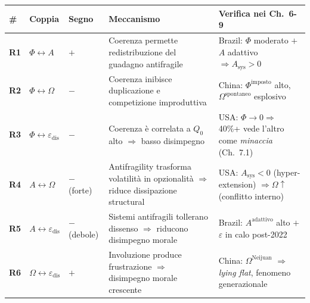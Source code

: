 {\def\LTcaptype{none} %
{\small\begin{longtable}[]{@{}
  >{\raggedright\arraybackslash}p{}
  >{\raggedright\arraybackslash}p{}
  >{\raggedright\arraybackslash}p{}
  >{\raggedright\arraybackslash}p{}
  >{\raggedright\arraybackslash}p{}@{}}
\toprule\noalign{}
\begin{minipage}[b]{\linewidth}\raggedright
\#
\end{minipage} & \begin{minipage}[b]{\linewidth}\raggedright
Coppia
\end{minipage} & \begin{minipage}[b]{\linewidth}\raggedright
Segno
\end{minipage} & \begin{minipage}[b]{\linewidth}\raggedright
Meccanismo
\end{minipage} & \begin{minipage}[b]{\linewidth}\raggedright
Verifica nei Ch.~6-9
\end{minipage} \\
\midrule\noalign{}
\endhead
\bottomrule\noalign{}
\endlastfoot
\textbf{R1} & \(\Phi \leftrightarrow A\) & \(+\) & Coerenza permette
redistribuzione del guadagno antifragile & Brazil: \(\Phi\) moderato
\(+\) \(A\) adattivo \(\Rightarrow A_{\text{sys}} > 0\) \\
\textbf{R2} & \(\Phi \leftrightarrow \Omega\) & \(-\) & Coerenza
inibisce duplicazione e competizione improduttiva & China:
\(\Phi^{\text{imposto}}\) alto, \(\Omega^{\text{spontaneo}}\)
esplosivo \\
\textbf{R3} & \(\Phi \leftrightarrow \varepsilon_{\text{dis}}\) & \(-\)
& Coerenza è correlata a \(Q_0\) alto \(\Rightarrow\) basso disimpegno &
USA: \(\Phi \to 0 \Rightarrow\) 40\%+ vede l'altro come \emph{minaccia}
(Ch.~7.1) \\
\textbf{R4} & \(A \leftrightarrow \Omega\) & \(-\) (forte) &
Antifragility trasforma volatilità in opzionalità \(\Rightarrow\) riduce
dissipazione structural & USA: \(A_{\text{sys}} < 0\) (hyper-extension)
\(\Rightarrow \Omega \uparrow\) (conflitto interno) \\
\textbf{R5} & \(A \leftrightarrow \varepsilon_{\text{dis}}\) & \(-\)
(debole) & Sistemi antifragili tollerano dissenso \(\Rightarrow\)
riducono disimpegno morale & Brazil: \(A^{\text{adattivo}}\) alto \(+\)
\(\varepsilon\) in calo post-2022 \\
\textbf{R6} & \(\Omega \leftrightarrow \varepsilon_{\text{dis}}\) &
\(+\) & Involuzione produce frustrazione \(\Rightarrow\) disimpegno
morale crescente & China: \(\Omega^{\text{Neijuan}}\) \(\Rightarrow\)
\emph{lying flat}, fenomeno generazionale \\
\end{longtable}}
}

